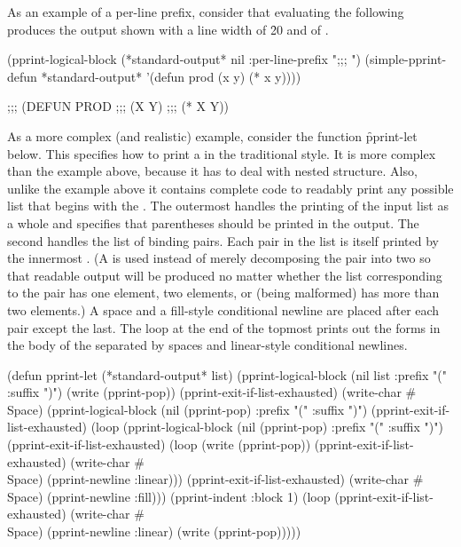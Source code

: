 As an example of a per-line prefix, consider that evaluating the following
produces the output shown with a line width of \f{20} and
 of \nil.
 
\code
 (pprint-logical-block (*standard-output* nil :per-line-prefix ";;; ")
   (simple-pprint-defun *standard-output* '(defun prod (x y) (* x y))))
 
 ;;; (DEFUN PROD
 ;;;        (X Y)
 ;;;   (* X Y))
\endcode
 
As a more complex (and realistic) example, consider the function \f{pprint-let}
below.  This specifies how to print a   in the traditional
style.  It is more complex than the example above, because it has to deal with
nested structure.  Also, unlike the example above it contains complete code to 
readably print any possible list that begins with the  .
The outermost   handles the printing of
the input list as a whole and specifies that parentheses should be printed in the
output.  The second   handles the list 
of binding pairs.  Each pair in the list is itself printed by the innermost
.  (A   is used instead of
merely decomposing the pair into two  so that readable output will
be produced no matter whether the list corresponding to the pair has one element,
two elements, or (being malformed) has more than two elements.)   
A space and a 
fill-style conditional newline
are placed after
each pair except the last.  The loop at the end of the topmost
  prints out the forms in the body
of the   separated by spaces and 
linear-style conditional newlines.
 
\code
 (defun pprint-let (*standard-output* list)
   (pprint-logical-block (nil list :prefix "(" :suffix ")")
     (write (pprint-pop))
     (pprint-exit-if-list-exhausted)
     (write-char #\\Space)
     (pprint-logical-block (nil (pprint-pop) :prefix "(" :suffix ")")
       (pprint-exit-if-list-exhausted)
       (loop (pprint-logical-block (nil (pprint-pop) :prefix "(" :suffix ")")
               (pprint-exit-if-list-exhausted)
               (loop (write (pprint-pop))
                     (pprint-exit-if-list-exhausted)
                     (write-char #\\Space)
                     (pprint-newline :linear)))
             (pprint-exit-if-list-exhausted)
             (write-char #\\Space)
             (pprint-newline :fill)))
     (pprint-indent :block 1)
     (loop (pprint-exit-if-list-exhausted)
           (write-char #\\Space)
           (pprint-newline :linear)
           (write (pprint-pop)))))
\endcode
 
